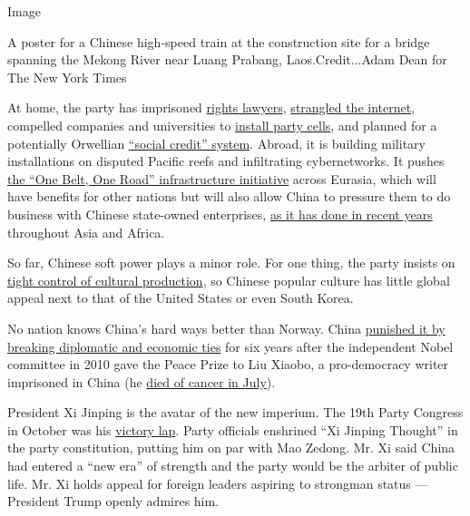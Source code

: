 Image

A poster for a Chinese high-speed train at the construction site for a
bridge spanning the Mekong River near Luang Prabang, Laos.Credit...Adam
Dean for The New York Times

At home, the party has imprisoned
\href{https://www.nytimes3xbfgragh.onion/2015/07/23/world/asia/china-crackdown-human-rights-lawyers.html}{rights
lawyers},
\href{https://www.nytimes3xbfgragh.onion/2017/12/14/opinion/net-neutrality-china-internet.html}{strangled
the internet}, compelled companies and universities to
\href{https://www.nytimes3xbfgragh.onion/2017/02/12/opinion/china-the-party-corporate-complex.html}{install
party cells}, and planned for a potentially Orwellian
\href{https://www.nytimes3xbfgragh.onion/2018/01/04/business/china-alibaba-privacy.html?_r=0}{``social
credit'' system}. Abroad, it is building military installations on
disputed Pacific reefs and infiltrating cybernetworks. It pushes
\href{https://www.nytimes3xbfgragh.onion/2017/05/13/business/china-railway-one-belt-one-road-1-trillion-plan.html?_r=0}{the
``One Belt, One Road'' infrastructure initiative} across Eurasia, which
will have benefits for other nations but will also allow China to
pressure them to do business with Chinese state-owned enterprises,
\href{http://www.nytimes3xbfgragh.onion/2009/12/21/world/asia/21china.html}{as
it has done in recent years} throughout Asia and Africa.

So far, Chinese soft power plays a minor role. For one thing, the party
insists on
\href{http://www.nytimes3xbfgragh.onion/interactive/world/asia/culture-and-control-in-china-series.html}{tight
control of cultural production}, so Chinese popular culture has little
global appeal next to that of the United States or even South Korea.

No nation knows China's hard ways better than Norway. China
\href{https://www.nytimes3xbfgragh.onion/2016/12/19/world/europe/china-norway-nobel-liu-xiaobo.html}{punished
it by breaking diplomatic and economic ties} for six years after the
independent Nobel committee in 2010 gave the Peace Prize to Liu Xiaobo,
a pro-democracy writer imprisoned in China (he
\href{https://www.nytimes3xbfgragh.onion/2017/07/13/world/asia/liu-xiaobo-dead.html}{died
of cancer in July}).

President Xi Jinping is the avatar of the new imperium. The 19th Party
Congress in October was his
\href{https://www.nytimes3xbfgragh.onion/2017/10/24/world/asia/china-xi-jinping-communist-party.html}{victory
lap}. Party officials enshrined ``Xi Jinping Thought'' in the party
constitution, putting him on par with Mao Zedong. Mr. Xi said China had
entered a ``new era'' of strength and the party would be the arbiter of
public life. Mr. Xi holds appeal for foreign leaders aspiring to
strongman status --- President Trump openly admires him.

